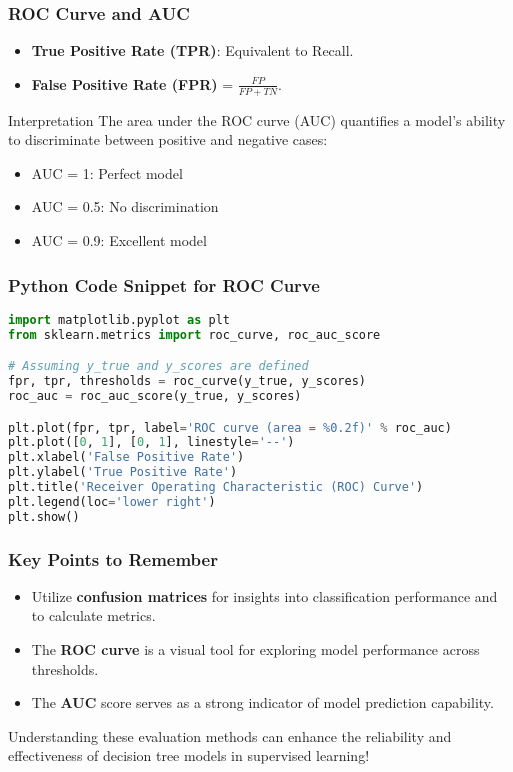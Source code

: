 \documentclass[aspectratio=169]{beamer}
\begin{document}
\begin{frame}[fragile]
  \frametitle{ROC Curve and AUC}
  \begin{itemize}
    \item \textbf{True Positive Rate (TPR)}: Equivalent to Recall.
    \item \textbf{False Positive Rate (FPR)} = $\frac{FP}{FP + TN}$.
  \end{itemize}
  \begin{block}{Interpretation}
    The area under the ROC curve (AUC) quantifies a model's ability to discriminate between positive and negative cases:
    \begin{itemize}
      \item AUC = 1: Perfect model
      \item AUC = 0.5: No discrimination
      \item AUC = 0.9: Excellent model
    \end{itemize}
  \end{block}
\end{frame}

\begin{frame}[fragile]
  \frametitle{Python Code Snippet for ROC Curve}
  \begin{lstlisting}[language=Python]
import matplotlib.pyplot as plt
from sklearn.metrics import roc_curve, roc_auc_score

# Assuming y_true and y_scores are defined
fpr, tpr, thresholds = roc_curve(y_true, y_scores)
roc_auc = roc_auc_score(y_true, y_scores)

plt.plot(fpr, tpr, label='ROC curve (area = %0.2f)' % roc_auc)
plt.plot([0, 1], [0, 1], linestyle='--')
plt.xlabel('False Positive Rate')
plt.ylabel('True Positive Rate')
plt.title('Receiver Operating Characteristic (ROC) Curve')
plt.legend(loc='lower right')
plt.show()
  \end{lstlisting}
\end{frame}

\begin{frame}[fragile]
  \frametitle{Key Points to Remember}
  \begin{itemize}
    \item Utilize \textbf{confusion matrices} for insights into classification performance and to calculate metrics.
    \item The \textbf{ROC curve} is a visual tool for exploring model performance across thresholds.
    \item The \textbf{AUC} score serves as a strong indicator of model prediction capability.
  \end{itemize}
  
  Understanding these evaluation methods can enhance the reliability and effectiveness of decision tree models in supervised learning!
\end{frame}
\end{document}
